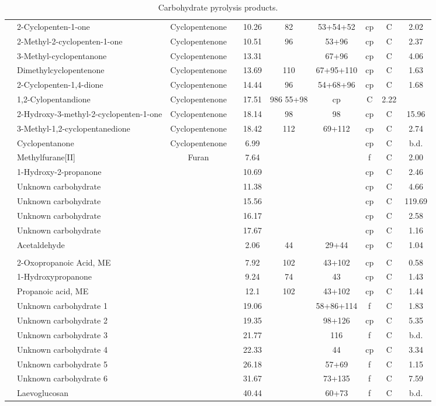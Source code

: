 \documentclass[preprint,review,12pt]{elsarticle}
\begin{document}
\begin{table*}[p!]
\begin{center}
{\begin{tabular}{llclcccccc}
\\
&		2-Cyclopenten-1-one&		Cyclopentenone&		&		10.26&		82&	53+54+52&	cp&	C&	2.02\\
&		2-Methyl-2-cyclopenten-1-one&	Cyclopentenone&		&		10.51&		96&	53+96&		cp&	C&	2.37\\
&		3-Methyl-cyclopentanone&	Cyclopentenone&		&		13.31&		&	67+96&		cp&	C&	4.06\\
&		Dimethylcyclopentenone&		Cyclopentenone&		&		13.69&		110&	67+95+110&	cp&	C&	1.63\\
&		2-Cyclopenten-1,4-dione&	Cyclopentenone&		&		14.44&		96&	54+68+96&	cp&	C&	1.68\\
&		1,2-Cylopentandione&		Cyclopentenone&		&		17.51&		986	55+98&		cp&	C&	2.22\\
&		2-Hydroxy-3-methyl-2-cyclopenten-1-one&	Cyclopentenone&	&		18.14&		98&	98&		cp&	C&	15.96\\
&		3-Methyl-1,2-cyclopentanedione&	Cyclopentenone&		&		18.42&		112&	69+112&		cp&	C&	2.74\\
&		Cyclopentanone&			Cyclopentenone&		&		6.99&		&	&		cp&	C&	b.d.\\
&		Methylfurane[II]&		Furan&			&		7.64&		&	&		f&	C&	2.00\\
&		1-Hydroxy-2-propanone&		&			&		10.69&		&	&		cp&	C&	2.46\\
&		Unknown carbohydrate&		&			&		11.38&		&	&		cp&	C&	4.66\\
&		Unknown carbohydrate&		&			&		15.56&		&	&		cp&	C&	119.69\\
&		Unknown carbohydrate&		&			&		16.17&		&	&		cp&	C&	2.58\\
&		Unknown carbohydrate&		&			&		17.67&		&	&		cp&	C&	1.16\\
&		Acetaldehyde&			&			&		2.06&		44&	29+44&		cp&	C&	1.04\\
\\
&		2-Oxopropanoic Acid, ME&	&			&		7.92&		102&	43+102&		cp&	C&	0.58\\
&		1-Hydroxypropanone&		&			&		9.24&		74&	43&		cp&	C&	1.43\\
&		Propanoic acid, ME&		&			&		12.1&		102&	43+102&		cp&	C&	1.44\\
&		Unknown carbohydrate 1&		&			&		19.06&		&	58+86+114&	f&	C&	1.83\\
&		Unknown carbohydrate 2&		&			&		19.35&		&	98+126&		cp&	C&	5.35\\
&		Unknown carbohydrate 3&		&			&		21.77&		&	116&		f&	C&	b.d.\\
&		Unknown carbohydrate 4&		&			&		22.33&		&	44&		cp&	C&	3.34\\
&		Unknown carbohydrate 5&		&			&		26.18&		&	57+69&		f&	C&	1.15\\
&		Unknown carbohydrate 6&		&			&		31.67&		&	73+135&		f&	C&	7.59\\
&		Laevoglucosan&			&			&		40.44&		&	60+73&		f&	C&	b.d.\\

\hline
\end{tabular}}
\caption{Carbohydrate pyrolysis products.}
\end{center}
\label{tab:chprod}
\end{table*}
\end{document}
